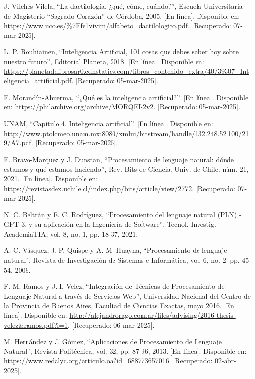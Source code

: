 \begin{thebibliography}{200}
    J. Vilches Vilela, “La dactilología, ¿qué, cómo, cuándo?”, Escuela Universitaria de Magisterio “Sagrado Corazón” de Córdoba, 2005. [En línea]. Disponible en: \url{https://www.uco.es/%7Efe1vivim/alfabeto_dactilologico.pdf}. [Recuperado: 07-mar-2025].

    L. P. Rouhiainen, “Inteligencia Artificial, 101 cosas que debes saber hoy sobre nuestro futuro”, Editorial Planeta, 2018. [En línea]. Disponible en: \url{https://planetadelibrosar0.cdnstatics.com/libros_contenido_extra/40/39307_Inteligencia_artificial.pdf}. [Recuperado: 05-mar-2025].

    F. Morandín-Ahuerma, “¿Qué es la inteligencia artificial?”. [En línea]. Disponible en: \url{https://philarchive.org/archive/MORQEI-2v2}. [Recuperado: 05-mar-2025].

    UNAM, “Capítulo 4. Inteligencia artificial”. [En línea]. Disponible en: \url{http://www.ptolomeo.unam.mx:8080/xmlui/bitstream/handle/132.248.52.100/219/A7.pdf}. [Recuperado: 05-mar-2025].

    F. Bravo-Marquez y J. Dunstan, “Procesamiento de lenguaje natural: dónde estamos y qué estamos haciendo”, Rev. Bits de Ciencia, Univ. de Chile, núm. 21, 2021. [En línea]. Disponible en: \url{https://revistasdex.uchile.cl/index.php/bits/article/view/2772}. [Recuperado: 07-mar-2025].
    
    N. C. Beltrán y E. C. Rodríguez, “Procesamiento del lenguaje natural (PLN) -GPT-3, y su aplicación en la Ingeniería de Software”, Tecnol. Investig. AcademiaTIA, vol. 8, no. 1, pp. 18-37, 2021.

    A. C. Vásquez, J. P. Quispe y A. M. Huayna, “Procesamiento de lenguaje natural”, Revista de Investigación de Sistemas e Informática, vol. 6, no. 2, pp. 45-54, 2009.

    F. M. Ramos y J. I. Velez, “Integración de Técnicas de Procesamiento de Lenguaje Natural a través de Servicios Web”, Universidad Nacional del Centro de la Provincia de Buenos Aires, Facultad de Ciencias Exactas, mayo 2016. [En línea]. Disponible en: \url{http://alejandrorago.com.ar/files/advising/2016-thesis-velez&ramos.pdf?i=1}. [Recuperado: 06-mar-2025].

    M. Hernández y J. Gómez, “Aplicaciones de Procesamiento de Lenguaje Natural”, Revista Politécnica, vol. 32, pp. 87-96, 2013. [En línea]. Disponible en: \url{https://www.redalyc.org/articulo.oa?id=688773657016}. [Recuperado: 02-abr-2025].


\end{thebibliography}
